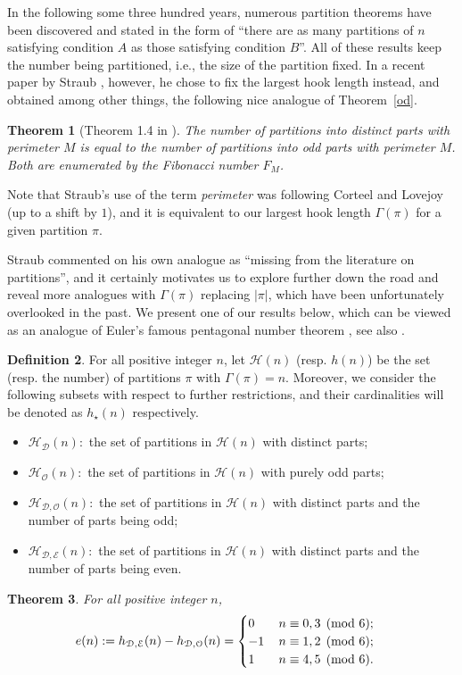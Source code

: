 \documentclass[12pt]{amsart}
\numberwithin{equation}{section}
\theoremstyle{plain}
\newtheorem{theorem}{Theorem}[section]
\theoremstyle{definition}
\newtheorem{Def}[theorem]{Definition}
\def\D{\mathcal{D}}
\def\O{\mathcal{O}}
\def\H{\mathcal{H}}
\def\E{\mathcal{E}}
\begin{document}
In the following some three hundred years, numerous partition theorems have been discovered and stated in the form of ``there are as many partitions of $n$ satisfying condition $A$ as those satisfying condition $B$''. All of these results keep the number being partitioned, i.e., the size of the partition fixed. In a recent paper by Straub \cite{Str}, however, he chose to fix the largest hook length instead, and obtained among other things, the following nice analogue of Theorem~\ref{od}.
\begin{theorem}[Theorem 1.4 in \cite{Str}]
\label{ana-od}
The number of partitions into distinct parts with perimeter $M$ is equal to the number of partitions into odd parts with perimeter $M$. Both are enumerated by the Fibonacci number $F_M$.
\end{theorem}
Note that Straub's use of the term \emph{perimeter} was following Corteel and Lovejoy \cite[Section 4.2]{CL} (up to a shift by $1$), and it is equivalent to our largest hook length $\Gamma(\pi)$ for a given partition $\pi$.

Straub commented on his own analogue as ``missing from the literature on partitions'', and it certainly motivates us to explore further down the road and reveal more analogues with $\Gamma(\pi)$ replacing $|\pi|$, which have been unfortunately overlooked in the past. We present one of our results below, which can be viewed as an analogue of Euler's famous pentagonal number theorem \cite{Eu1}, see also \cite[Corollary~1.7]{Andr}.
\begin{Def}
For all positive integer $n$, let $\H(n)$ (resp. $h(n)$) be the set (resp. the number) of partitions $\pi$ with $\Gamma(\pi)=n$. Moreover, we consider the following subsets with respect to further restrictions, and their cardinalities will be denoted as $h_{\star}(n)$ respectively.
\begin{itemize}
\item $\H_{\D}(n):$ the set of partitions in $\H(n)$ with distinct parts;
\item $\H_{\O}(n):$ the set of partitions in $\H(n)$ with purely odd parts;
\item $\H_{\D,\O}(n):$ the set of partitions in $\H(n)$ with distinct parts and the number of parts being odd;
\item $\H_{\D,\E}(n):$ the set of partitions in $\H(n)$ with distinct parts and the number of parts being even.
\end{itemize}
\end{Def}

\begin{theorem}\label{ana-pent}
For all positive integer $n$,
\begin{align}\label{id:ana-pent}
e(n) &:=h_{\D,\E}(n)-h_{\D,\O}(n)=
\begin{cases}
0\, &n\equiv 0,3\pmod {6};\cr -1\, &n\equiv 1,2\pmod {6};\cr 1\, &n\equiv 4,5\pmod {6}.\end{cases}
\end{align}
\end{theorem}
\end{document}
